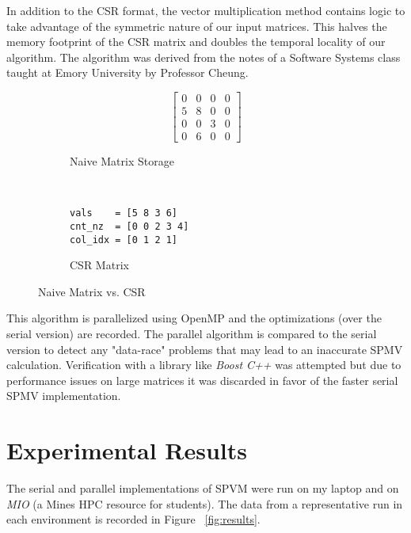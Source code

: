 \documentclass[pageno]{jpaper}
\begin{document}
In addition to the CSR format, the vector multiplication method contains logic
to take advantage of the symmetric nature of our input matrices. This halves
the memory footprint of the CSR matrix and doubles the temporal locality of our 
algorithm. The algorithm\cite{csrmultiplication} was derived from the notes of
a Software Systems class taught at Emory University by Professor Cheung.

\begin{figure}[t]
    \centering
    \begin{subfigure}[b]{0.2\textwidth}
    \[
    \begin{bmatrix}
0 & 0 & 0 & 0 \\
5 & 8 & 0 & 0 \\
0 & 0 & 3 & 0 \\
0 & 6 & 0 & 0
    \end{bmatrix}
    \]
    \caption{Naive Matrix Storage}
    \end{subfigure}
    ~
    \begin{subfigure}[b]{0.25\textwidth}
    \begin{lstlisting}
vals    = [5 8 3 6]
cnt_nz  = [0 0 2 3 4]
col_idx = [0 1 2 1]
    \end{lstlisting}
    \caption{CSR Matrix}
    \end{subfigure}
    \caption{Naive Matrix vs. CSR}
    \label{fig:naivevscsr}
\end{figure}

This algorithm is parallelized using OpenMP and the optimizations (over the
serial version) are recorded. The parallel algorithm is compared to the 
serial version to detect any "data-race" problems that may lead to an 
inaccurate SPMV calculation. Verification with a library like 
\textit{Boost C++} was attempted but due to performance issues on large 
matrices it was discarded in favor of the faster serial SPMV implementation.

\section{Experimental Results}

The serial and parallel implementations of SPVM were run on my laptop and
on \textit{MIO} (a Mines HPC resource for students). The data from a
representative run in each environment is recorded in Figure ~\ref{fig:results}.
\end{document}
